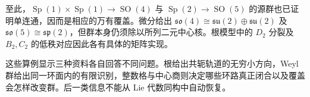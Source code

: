至此，\(\operatorname{Sp}(1)\times\operatorname{Sp}(1)\to\operatorname{SO}(4)\) 与 \(\operatorname{Sp}(2)\to\operatorname{SO}(5)\) 的源群也已证明单连通，因而是相应的万有覆盖。微分给出 \(\mathfrak{so}(4)\cong\mathfrak{su}(2)\oplus\mathfrak{su}(2)\) 及 \(\mathfrak{so}(5)\cong\mathfrak{sp}(2)\)，但群本身仍须除以所列二元中心核。根模型中的 \(D_2\) 分裂及 \(B_2,C_2\) 的低秩对应因此各有具体的矩阵实现。

\ProseParagraphBreak

这些算例显示三种资料各自回答不同问题。根给出共轭轨道的无穷小方向，Weyl 群给出同一环面内的有限识别，整数格与中心商则决定哪些环路真正闭合以及覆盖会怎样改变群。后一类信息不能从 Lie 代数同构中自动恢复。
